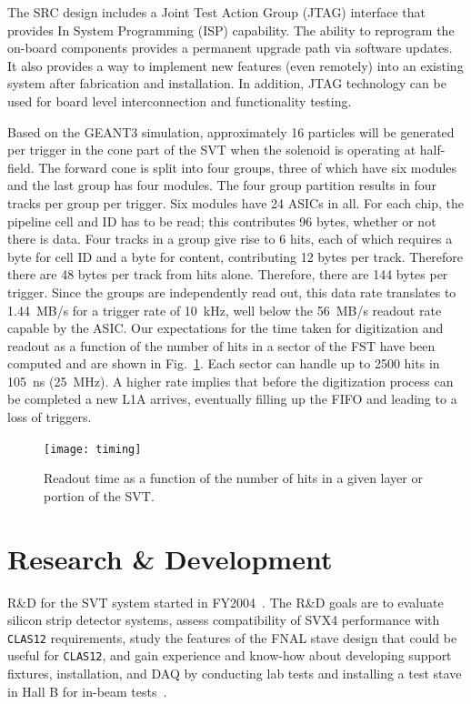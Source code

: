 The SRC design includes a Joint Test Action Group (JTAG) interface that 
provides In System Programming (ISP) capability.  The ability to reprogram 
the on-board components provides a permanent upgrade path via software 
updates.  It also provides a way to implement new features (even remotely) 
into an existing system after fabrication and installation.  In addition, 
JTAG technology can be used for board level interconnection and 
functionality testing.

Based on the GEANT3 simulation, approximately 16 particles will be 
generated per trigger in the cone part of the SVT when the solenoid is 
operating at half-field.  The forward cone is split into four groups, 
three of which have six modules and the last group has four modules.  The 
four group partition results in four tracks per group per trigger.  Six 
modules have 24 ASICs in all.  For each chip, the pipeline cell and ID has 
to be read; this contributes 96 bytes, whether or not there is data.  Four 
tracks in a group give rise to 6 hits, each of which requires a byte for 
cell ID and a byte for content, contributing 12 bytes per track.  Therefore 
there are 48 bytes per track from hits alone.  Therefore, there are 144 
bytes per trigger.  Since the groups are independently read out, this data 
rate translates to 1.44~MB/s for a trigger rate of 10~kHz, well below the 
56~MB/s readout rate capable by the ASIC.  Our expectations for the time 
taken for digitization and readout as a function of the number of hits in 
a sector of the FST have been computed and are shown in Fig.~\ref{readtiming}.
Each sector can handle up to 2500 hits in 105~ns (25~MHz).  A higher rate 
implies that before the digitization process can be completed a new L1A 
arrives, eventually filling up the FIFO and leading to a loss of triggers.

\begin{figure}[htbp]
\centering
\texttt{[image: timing]}
\caption{\small{Readout time as a function of the number of hits in a
given layer or portion of the SVT.}}
\label{readtiming}
\end{figure}

\section{Research \& Development}

R\&D for the SVT system started in FY2004~\cite{CN2004-29}.  The R\&D 
goals are to evaluate silicon strip detector systems, assess compatibility 
of SVX4 performance with {\tt CLAS12} requirements, study the features of 
the FNAL stave design that could be useful for {\tt CLAS12}, and gain 
experience and know-how about developing support fixtures, installation, 
and DAQ by conducting lab tests and installing a test stave in Hall B for
in-beam tests~\cite{CN2004-42}.  

